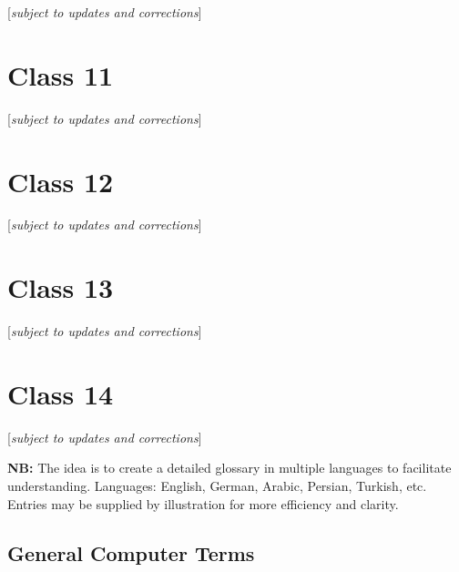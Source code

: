 \documentclass[
]{book}
\begin{document}
{[}\emph{subject to updates and corrections}{]}

\hypertarget{class-11}{%
\chapter{Class 11}\label{class-11}}

{[}\emph{subject to updates and corrections}{]}

\hypertarget{class-12}{%
\chapter{Class 12}\label{class-12}}

{[}\emph{subject to updates and corrections}{]}

\hypertarget{class-13}{%
\chapter{Class 13}\label{class-13}}

{[}\emph{subject to updates and corrections}{]}

\hypertarget{class-14}{%
\chapter{Class 14}\label{class-14}}

{[}\emph{subject to updates and corrections}{]}

\textbf{NB:} The idea is to create a detailed glossary in multiple languages to facilitate understanding. Languages: English, German, Arabic, Persian, Turkish, etc. Entries may be supplied by illustration for more efficiency and clarity.

\hypertarget{general-computer-terms}{%
\section{General Computer Terms}\label{general-computer-terms}}
\end{document}
